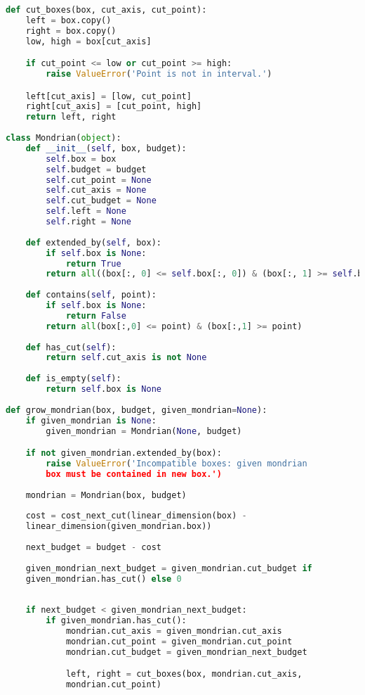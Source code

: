 \begin{lstlisting}[language=Python]
def cut_boxes(box, cut_axis, cut_point):
    left = box.copy()
    right = box.copy()
    low, high = box[cut_axis]

    if cut_point <= low or cut_point >= high:
        raise ValueError('Point is not in interval.')

    left[cut_axis] = [low, cut_point]
    right[cut_axis] = [cut_point, high]
    return left, right
    
class Mondrian(object):
    def __init__(self, box, budget):
        self.box = box
        self.budget = budget
        self.cut_point = None
        self.cut_axis = None
        self.cut_budget = None
        self.left = None
        self.right = None
        
    def extended_by(self, box):
        if self.box is None:
            return True
        return all((box[:, 0] <= self.box[:, 0]) & (box[:, 1] >= self.box[:, 1]))
    
    def contains(self, point):
        if self.box is None:
            return False
        return all(box[:,0] <= point) & (box[:,1] >= point)
    
    def has_cut(self):
        return self.cut_axis is not None
    
    def is_empty(self):
        return self.box is None
    
def grow_mondrian(box, budget, given_mondrian=None):
    if given_mondrian is None:
        given_mondrian = Mondrian(None, budget)

    if not given_mondrian.extended_by(box):
        raise ValueError('Incompatible boxes: given mondrian 
        box must be contained in new box.')
    
    mondrian = Mondrian(box, budget)
    
    cost = cost_next_cut(linear_dimension(box) -
    linear_dimension(given_mondrian.box))
    
    next_budget = budget - cost
    
    given_mondrian_next_budget = given_mondrian.cut_budget if
    given_mondrian.has_cut() else 0
    
    
    if next_budget < given_mondrian_next_budget:        
        if given_mondrian.has_cut():
            mondrian.cut_axis = given_mondrian.cut_axis
            mondrian.cut_point = given_mondrian.cut_point
            mondrian.cut_budget = given_mondrian_next_budget

            left, right = cut_boxes(box, mondrian.cut_axis,
            mondrian.cut_point)


\end{lstlisting}
